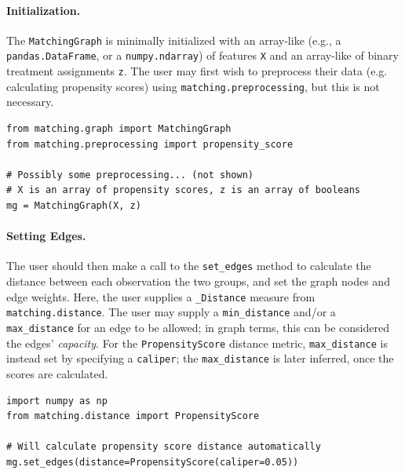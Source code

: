 \documentclass[11pt]{extarticle}
\begin{document}
\paragraph{Initialization.} 
The \texttt{MatchingGraph} is minimally initialized with an array-like (e.g., a \texttt{pandas.DataFrame}, or a \texttt{numpy.ndarray}) of features \texttt{X} and an array-like of binary treatment assignments \texttt{z}. The user may first wish to preprocess their data (e.g. calculating propensity scores) using \texttt{matching.preprocessing}, but this is not necessary.
\begin{verbatim}
from matching.graph import MatchingGraph
from matching.preprocessing import propensity_score

# Possibly some preprocessing... (not shown)
# X is an array of propensity scores, z is an array of booleans
mg = MatchingGraph(X, z)
\end{verbatim}
\paragraph{Setting Edges.} The user should then make a call to the \texttt{set\_edges} method to calculate the distance between each observation the two groups, and set the graph nodes and edge weights. Here, the user supplies a \texttt{\_Distance} measure from \texttt{matching.distance}. The user may supply a \texttt{min\_distance} and/or a \texttt{max\_distance} for an edge to be allowed; in graph terms, this can be considered the edges' \emph{capacity}. For the \texttt{PropensityScore} distance metric, \texttt{max\_distance} is instead set by specifying a \texttt{caliper}; the \texttt{max\_distance} is later inferred, once the scores are calculated.
\begin{verbatim}
import numpy as np
from matching.distance import PropensityScore

# Will calculate propensity score distance automatically
mg.set_edges(distance=PropensityScore(caliper=0.05))
\end{verbatim}
\end{document}
